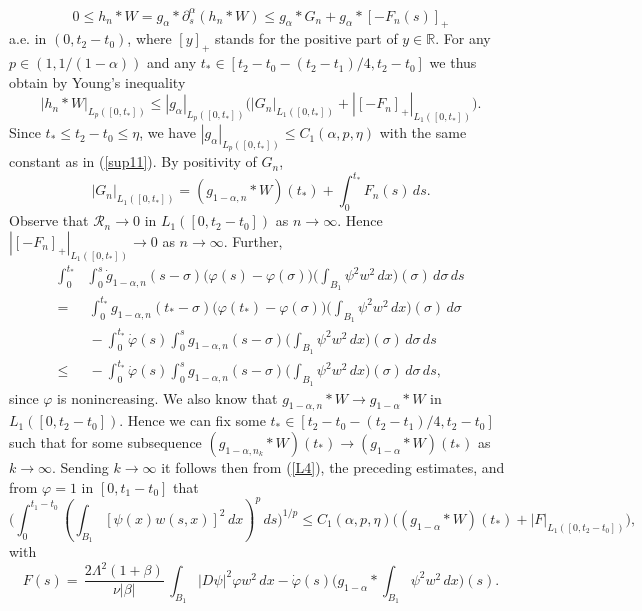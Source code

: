 \documentclass[10pt]{article}
\newcommand{\iR}{\mathbb{R}}
\begin{document}
\[
0\le h_n\ast W =g_\alpha\ast \partial_s^\alpha (h_n\ast W)\le
g_\alpha\ast G_n+g_\alpha\ast [-F_n(s)]_+
\]
a.e. in $(0,t_2-t_0)$, where $[y]_+$ stands for the positive part
of $y\in \iR$. For any $p\in (1,1/(1-\alpha))$ and any
$t_*\in[t_2-t_0-(t_2-t_1)/4,t_2-t_0]$ we thus obtain by Young's
inequality
\begin{equation} \label{L4}
|h_n\ast W|_{L_p([0,t_*])}\le
|g_\alpha|_{L_p([0,t_*])}\big(|G_n|_{L_1([0,t_*])}+
|[-F_n]_+|_{L_1([0,t_*])}\big).
\end{equation}
Since $t_*\le t_2-t_0\le \eta$, we have
$|g_\alpha|_{L_p([0,t_*])}\le C_1(\alpha,p,\eta)$ with the same
constant as in (\ref{sup11}). By positivity of $G_n$,
\[
|G_n|_{L_1([0,t_*])}=(g_{1-\alpha,n}\ast
W)(t_*)+\int_0^{t_*}\!\!\!F_n(s)\,ds.
\]
Observe that $\mathcal{R}_n\rightarrow 0$ in $L_1([0,t_2-t_0])$ as
$n\to \infty$. Hence $|[-F_n]_+|_{L_1([0,t_*])}\to 0$ as
$n\to\infty$. Further,
\begin{align*}
\int_0^{t_*}\!\!&\!\int_0^s
\dot{g}_{1-\alpha,n}(s-\sigma)\big(\varphi(s)-\varphi(\sigma)\big)
\big(\int_{B_1}\psi^2w^2\,dx\big)(\sigma)\,d\sigma\,ds\\
=&\,\int_0^{t_*}
{g}_{1-\alpha,n}(t_*-\sigma)\big(\varphi(t_*)-\varphi(\sigma)\big)
\big(\int_{B_1}\psi^2w^2\,dx\big)(\sigma)\,d\sigma\\
&\,-\int_0^{t_*}\!\!\!\dot{\varphi}(s)\int_0^s
{g}_{1-\alpha,n}(s-\sigma)
\big(\int_{B_1}\psi^2w^2\,dx\big)(\sigma)\,d\sigma\,ds\\
\le&\,-\int_0^{t_*}\!\!\!\dot{\varphi}(s)\int_0^s
{g}_{1-\alpha,n}(s-\sigma)
\big(\int_{B_1}\psi^2w^2\,dx\big)(\sigma)\,d\sigma\,ds,
\end{align*}
since $\varphi$ is nonincreasing. We also know that
$g_{1-\alpha,n}\ast W\to g_{1-\alpha}\ast W$ in
$L_1([0,t_2-t_0])$. Hence we can fix some
$t_*\in[t_2-t_0-(t_2-t_1)/4,t_2-t_0]$ such that for some
subsequence $(g_{1-\alpha,n_k}\ast W)(t_*)\to (g_{1-\alpha}\ast
W)(t_*)$ as $k\to \infty$. Sending $k\to \infty$ it follows then
from (\ref{L4}), the preceding estimates, and from $\varphi=1$ in
$[0,t_1-t_0]$ that
\begin{equation} \label{L5}
\Big(\int_{0}^{t_1-t_0} (\int_{B_1}
[\psi(x)w(s,x)]^2\,dx)^p\,ds\Big)^{1/p}\le
C_1(\alpha,p,\eta)\Big((g_{1-\alpha}\ast
W)(t_*)+|F|_{L_1([0,t_2-t_0])}\Big),
\end{equation}
with
\[
F(s)=\,\frac{2\Lambda^2(1+\beta)}{\nu |\beta|}\, \int_{B_1}
|D\psi|^2\varphi w^2\,dx-\dot{\varphi}(s)\big(g_{1-\alpha}\ast
\int_{B_1}\psi^2w^2\,dx\big)(s).
\]
\end{document}
